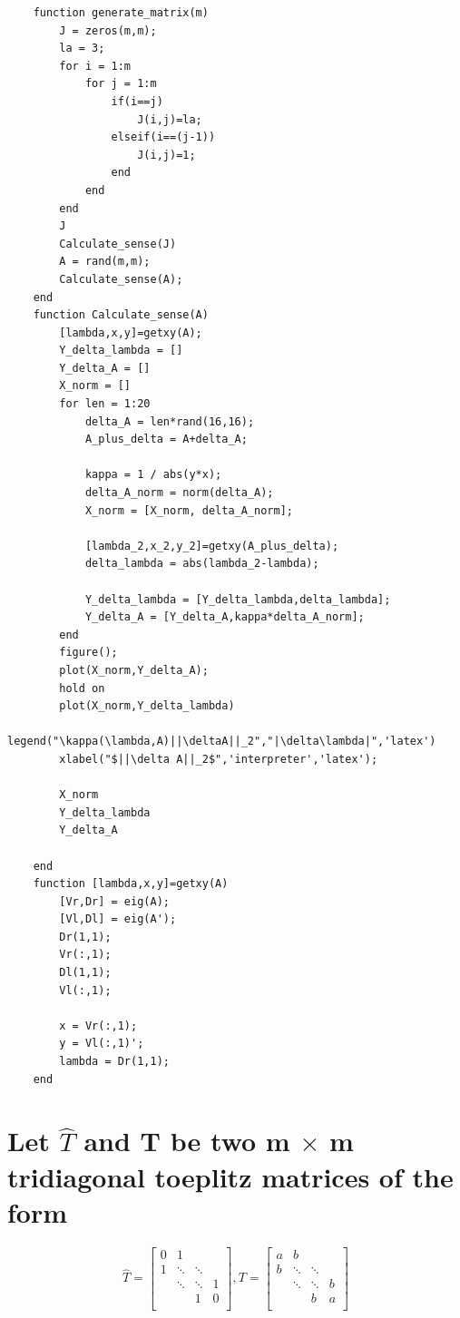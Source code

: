 \documentclass[12pt]{article}
\begin{document}
\begin{lstlisting}
    function generate_matrix(m)
        J = zeros(m,m);
        la = 3;
        for i = 1:m
            for j = 1:m
                if(i==j)
                    J(i,j)=la;
                elseif(i==(j-1))
                    J(i,j)=1;
                end
            end
        end
        J
        Calculate_sense(J)
        A = rand(m,m);
        Calculate_sense(A);
    end
    function Calculate_sense(A)
        [lambda,x,y]=getxy(A);
        Y_delta_lambda = []
        Y_delta_A = []
        X_norm = []
        for len = 1:20
            delta_A = len*rand(16,16);
            A_plus_delta = A+delta_A;

            kappa = 1 / abs(y*x);
            delta_A_norm = norm(delta_A);
            X_norm = [X_norm, delta_A_norm];

            [lambda_2,x_2,y_2]=getxy(A_plus_delta);
            delta_lambda = abs(lambda_2-lambda);

            Y_delta_lambda = [Y_delta_lambda,delta_lambda];
            Y_delta_A = [Y_delta_A,kappa*delta_A_norm];
        end
        figure();
        plot(X_norm,Y_delta_A);
        hold on
        plot(X_norm,Y_delta_lambda)
        legend("\kappa(\lambda,A)||\deltaA||_2","|\delta\lambda|",'latex')
        xlabel("$||\delta A||_2$",'interpreter','latex');

        X_norm
        Y_delta_lambda
        Y_delta_A
        
    end
    function [lambda,x,y]=getxy(A)
        [Vr,Dr] = eig(A);
        [Vl,Dl] = eig(A');
        Dr(1,1);
        Vr(:,1);
        Dl(1,1);
        Vl(:,1);

        x = Vr(:,1);
        y = Vl(:,1)';
        lambda = Dr(1,1);
    end
\end{lstlisting}
    \section{Let $\hat T$ and T be two m $\times$ m tridiagonal toeplitz matrices of the form}
            \[
                \hat T =
                \left[
                \begin{array}{cccc}
                0 & 1   \\
                1 & \ddots & \ddots & \\
                  & \ddots & \ddots & 1\\
                  &        &    1   & 0\\
                \end{array}\right]
                ,
                T =
                \left[
                \begin{array}{cccc}
                a & b   \\
                b & \ddots & \ddots & \\
                  & \ddots & \ddots & b\\
                  &        &    b   & a\\
                \end{array}\right]
            \]
\end{document}
